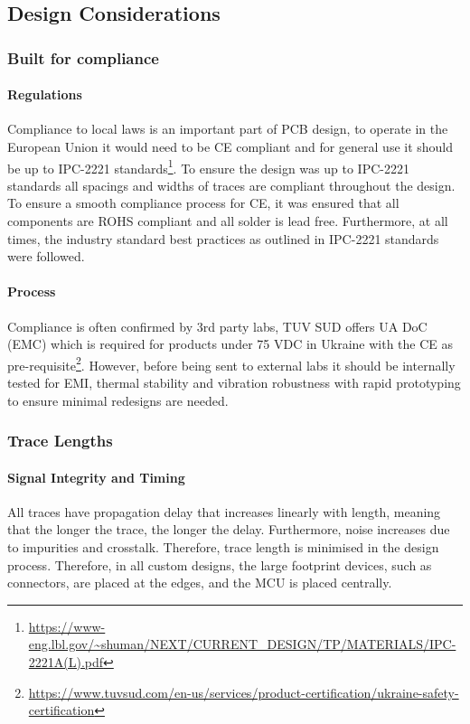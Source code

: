 \subsection{Design Considerations}\label{sub_section:tgt_design_considerations}

\subsubsection{Built for compliance}
\paragraph{Regulations}
Compliance to local laws is an important part of \gls{PCB} design, to operate in the European Union it would need to be CE compliant and for general use it should be up to IPC-2221 standards\footnote{\url{https://www-eng.lbl.gov/~shuman/NEXT/CURRENT_DESIGN/TP/MATERIALS/IPC-2221A(L).pdf}}. To ensure the design was up to IPC-2221 standards all spacings and widths of traces are compliant throughout the design. To ensure a smooth compliance process for CE, it was ensured that all components are \gls{ROHS} compliant and all solder is lead free. Furthermore, at all times, the industry standard best practices as outlined in IPC-2221 standards were followed.
\paragraph{Process}
Compliance is often confirmed by 3rd party labs, TUV SUD offers UA DoC (EMC) which is required for products under 75 VDC in Ukraine with the CE as pre-requisite\footnote{\url{https://www.tuvsud.com/en-us/services/product-certification/ukraine-safety-certification}}. However, before being sent to external labs it should be internally tested for \gls{EMI}, thermal stability and vibration robustness with rapid prototyping to ensure minimal redesigns are needed.

\subsubsection{Trace Lengths}\label{sub_sub_section:tgt_trace_lengths}
\paragraph{Signal Integrity and Timing}
All traces have propagation delay that increases linearly with length, meaning that the longer the trace, the longer the delay. Furthermore, noise increases due to impurities and crosstalk. Therefore, trace length is minimised in the design process. Therefore, in all custom designs, the large footprint devices, such as connectors, are placed at the edges, and the \gls{MCU} is placed centrally.
